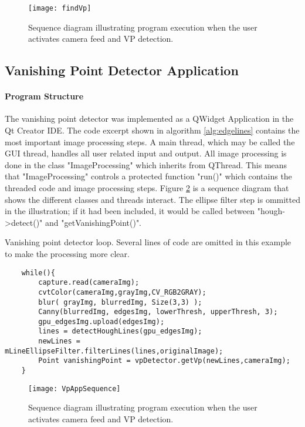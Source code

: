 \begin{figure}
	\texttt{[image: findVp]}
	\caption{Sequence diagram illustrating program execution when the user activates camera feed and VP detection.}
	\label{fig:findVp}
\end{figure}

\subsection{Vanishing Point Detector Application}

\paragraph{Program Structure}

The vanishing point detector was implemented as a QWidget Application in the Qt Creator IDE. The code excerpt shown in algorithm \ref{alg:edgelines} contains the most important image processing steps. A main thread, which may be called the GUI thread, handles all user related input and output. All image processing is done in the class "ImageProcessing" which inherits from QThread. This means that "ImageProcessing" controls a protected function "run()" which contains the threaded code and image processing steps. Figure \ref{fig:VpAppSequence} is a sequence diagram that shows the different classes and threads interact. The ellipse filter step is ommitted in the illustration; if it had been included, it would be called between "hough->detect()" and "getVanishingPoint()".

\begin{algorithm}[h]
	\caption{Vanishing point detector loop. Several lines of code are omitted in this example to make the processing more clear.}
	\label{alg:edgelines}
	\begin{verbatim}
	while(){
	    capture.read(cameraImg);
	    cvtColor(cameraImg,grayImg,CV_RGB2GRAY);
	    blur( grayImg, blurredImg, Size(3,3) );
	    Canny(blurredImg, edgesImg, lowerThresh, upperThresh, 3);
	    gpu_edgesImg.upload(edgesImg);
	    lines = detectHoughLines(gpu_edgesImg);   
	    newLines = mLineEllipseFilter.filterLines(lines,originalImage);
	    Point vanishingPoint = vpDetector.getVp(newLines,cameraImg);     
	}
	\end{verbatim}
\end{algorithm}

\begin{landscape}
	\begin{figure}
		\texttt{[image: VpAppSequence]}
		\caption{Sequence diagram illustrating program execution when the user activates camera feed and VP detection.}
		\label{fig:VpAppSequence}
	\end{figure}
\end{landscape}



